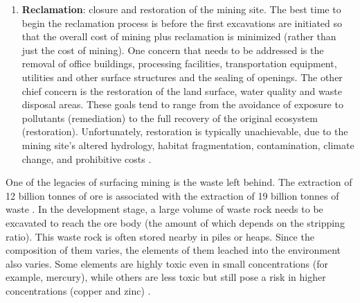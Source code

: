 \documentclass{article}
\begin{document}
\begin{enumerate}
    \item \textbf{Reclamation}: closure and restoration of the mining site. The best time to begin the reclamation process is before the first excavations are initiated so that the overall cost of mining plus reclamation is minimized (rather than just the cost of mining). One concern that needs to be addressed is the removal of office buildings, processing facilities, transportation equipment, utilities and other surface structures and the sealing of openings. The other chief concern is the restoration of the land surface, water quality and waste disposal areas. These goals tend to range from the avoidance of exposure to pollutants (remediation) to the full recovery of the original ecosystem (restoration). Unfortunately, restoration is typically unachievable, due to the mining site's altered hydrology, habitat fragmentation, contamination, climate change, and prohibitive costs \cite{lima2016legacy}.
\end{enumerate}


One of the legacies of surfacing mining is the waste left behind. The extraction of 12 billion tonnes of ore is associated with the extraction of 19 billion tonnes of waste \cite{copco2007mining}. In the development stage, a large volume of waste rock needs to be excavated to reach the ore body (the amount of which depends on the stripping ratio). This waste rock is often stored nearby in piles or heaps. Since the composition of them varies, the elements of them leached into the environment also varies. Some elements are highly toxic even in small concentrations (for example, mercury), while others are less toxic but still pose a risk in higher concentrations (copper and zinc) \cite{geointro}.
\end{document}
